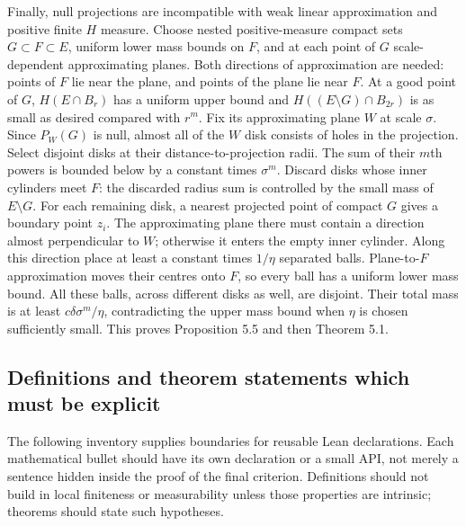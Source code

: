 Finally, null projections are incompatible with weak linear approximation
and positive finite $H$ measure. Choose nested positive-measure compact sets
$G\subset F\subset E$, uniform lower mass bounds on $F$, and at each point of
$G$ scale-dependent approximating planes. Both directions of approximation
are needed: points of $F$ lie near the plane, and points of the plane lie near
$F$. At a good point of $G$, $H(E\cap B_r)$ has a uniform upper bound and
$H((E\setminus G)\cap B_{2r})$ is as small as desired compared with $r^m$.
Fix its approximating plane $W$ at scale $\sigma$.
Since $P_W(G)$ is null, almost all of the $W$ disk consists of holes in the
projection. Select disjoint disks at their distance-to-projection radii.
The sum of their $m$th powers is bounded below by a constant times $\sigma^m$.
Discard disks whose inner cylinders meet $F$: the discarded radius sum is
controlled by the small mass of $E\setminus G$.
For each remaining disk, a nearest projected point of compact $G$ gives a
boundary point $z_i$. The approximating plane there must contain a direction
almost perpendicular to $W$; otherwise it enters the empty inner cylinder.
Along this direction place at least a constant times $1/\eta$ separated balls.
Plane-to-$F$ approximation moves their centres onto $F$, so every ball has a
uniform lower mass bound. All these balls, across different disks as well,
are disjoint. Their total mass is at least
$c\delta\sigma^m/\eta$, contradicting the upper mass bound when $\eta$ is
chosen sufficiently small. This proves Proposition 5.5 and then Theorem 5.1.

\subsection{Definitions and theorem statements which must be explicit}

The following inventory supplies boundaries for reusable Lean declarations.
Each mathematical bullet should have its own declaration or a small API,
not merely a sentence hidden inside the proof of the final criterion.
Definitions should not build in local finiteness or measurability unless
those properties are intrinsic; theorems should state such hypotheses.

